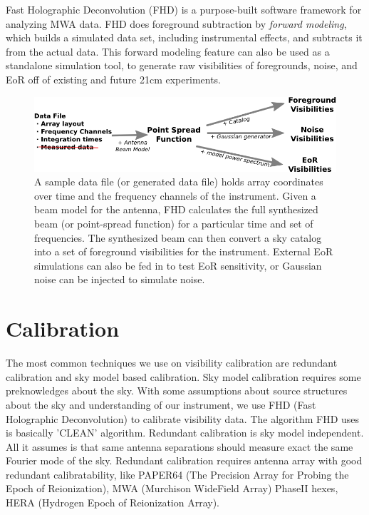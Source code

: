 \documentclass[a0,landscape]{a0poster}
\begin{document}
\begin{multicols}{4}
Fast Holographic Deconvolution (FHD) is a purpose-built software framework for analyzing MWA data. FHD does foreground subtraction by \emph{forward modeling}, which builds a simulated data set, including instrumental effects, and subtracts it from the actual data. This forward modeling feature can also be used as a standalone simulation tool, to generate raw visibilities of foregrounds, noise, and EoR off of existing and future 21cm experiments.
\begin{figure}[H]
\centering
\includegraphics[scale=1]{figures/sim_flowchart.png}
\caption{A sample data file (or generated data file) holds array coordinates over time and the frequency channels of the instrument. Given a beam model for the antenna, FHD calculates the full synthesized beam (or point-spread function) for a particular time and set of frequencies. The synthesized beam can then convert a sky catalog into a set of foreground visibilities for the instrument. External EoR simulations can also be fed in to test EoR sensitivity, or Gaussian noise can be injected to simulate noise.}
\end{figure}


\section*{Calibration}

The most common techniques we use on visibility calibration are redundant calibration and sky model based calibration. Sky model calibration requires some preknowledges about the sky. With some assumptions about source structures about the sky and understanding of our instrument, we use FHD (Fast Holographic Deconvolution) to calibrate visibility data. The algorithm FHD uses is basically 'CLEAN' algorithm. Redundant calibration is sky model independent. All it assumes is that same antenna separations should measure exact the same Fourier mode of the sky. Redundant calibration requires antenna array with good redundant calibratability, like PAPER64 (The Precision Array for Probing the Epoch of Reionization), MWA (Murchison WideField Array) PhaseII hexes, HERA (Hydrogen Epoch of Reionization Array).


\end{multicols}
\end{document}
